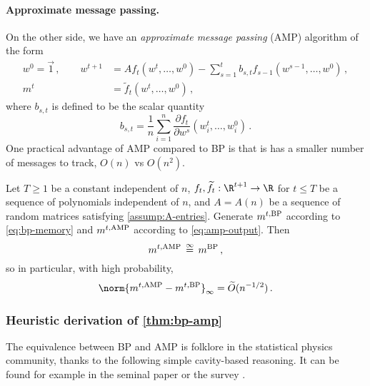 \documentclass[12pt]{article}
\newcommand{\eqinf}{\,\overset{\infty}{=}\,}
\begin{document}
\paragraph{Approximate message passing.} On the other side, we have an \emph{approximate message passing} (AMP) algorithm of the form
\begin{align}
    w^0 = \vec{1}\,, \qquad w^{t+1} &= A f_t(w^t, \dots, w^0) - \sum_{s = 1}^t b_{s,t} f_{s-1}(w^{s-1}, \dots, w^0)\,,\label{eq:amp}\\
    m^{t} &= \widetilde{f}_t(w^t, \dots, w^0)\,,\label{eq:amp-output}
\end{align}
where $b_{s,t}$ is defined to be the scalar quantity
\[b_{s,t}=\frac 1 n \sum_{i=1}^n \frac {\partial f_t}{\partial w^s}(w^{t}_i,\ldots,w^0_{i})\,.\]
One practical advantage 
of AMP compared to BP
is that is has a smaller number of messages to track,
$O(n)$ vs $O(n^2)$.

\begin{theorem}\label{thm:bp-amp}
    Let $T\ge 1$ be a constant independent of $n$, $f_t, \widetilde{f}_t:\R^{t+1}\to \R$ for $t\le T$ be a sequence of polynomials independent of $n$, and $A=A(n)$ be a sequence of random matrices satisfying \cref{assump:A-entries}. Generate $m^{t, \textnormal{BP}}$ according to \cref{eq:bp-memory} and $m^{t, \textnormal{AMP}}$
    according to \cref{eq:amp-output}.
    Then 
    \[
        m^{t,\textnormal{AMP}} \eqinf m^{\textnormal{BP}}\,,
    \]
    so in particular, with high probability,
    \begin{align*}
        \norm{m^{t,\textnormal{AMP}} - m^{t, \textnormal{BP}}}_\infty = \widetilde{O}(n^{-1/2})\,.
    \end{align*}
\end{theorem}

\subsubsection{Heuristic derivation of \cref{thm:bp-amp}}
\label{sec:bp-amp-heuristic}

The equivalence between BP and AMP is folklore
in the statistical physics community, thanks to
the following simple cavity-based reasoning. It 
can be found for example
in the seminal paper \cite[Appendix A]{donoho2009message}
or the survey \cite[Section IV.E]{zdeborova2016statistical}.
\end{document}
